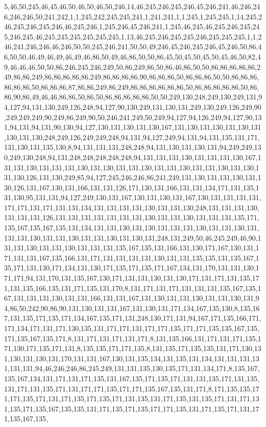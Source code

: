 5,46,50,245,46,45,46,50,46,50,46,50,246,14,46,245,246,245,246,45,246,241,46,246,246,246,246,50,241,242,1,1,245,242,245,245,241,1,241,241,1,1,245,1,245,245,1,14,245,246,245,246,245,246,46,245,246,1,245,246,45,246,241,1,245,46,245,46,245,246,245,245,246,245,46,245,245,245,245,245,245,1,13,46,245,246,245,245,246,245,245,245,1,1,246,241,246,246,46,246,50,50,245,246,241,50,50,49,246,45,246,245,246,45,246,50,86,46,50,50,46,49,46,49,46,49,46,86,50,49,46,86,50,50,86,45,50,45,50,45,50,45,46,50,82,49,46,46,46,50,50,86,246,245,246,249,50,86,249,86,50,86,46,86,50,50,86,86,86,86,86,249,86,86,249,86,86,86,86,86,249,86,86,86,86,90,86,86,86,50,86,86,86,50,50,86,86,86,86,86,86,50,86,86,86,87,86,86,249,86,249,86,86,86,86,86,86,50,86,86,86,86,86,50,86,86,90,86,49,46,46,86,86,50,86,50,86,86,86,86,86,50,50,249,130,248,249,130,249,131,94,127,94,131,130,249,126,248,94,127,90,130,249,131,130,131,249,130,249,126,249,90,249,249,249,90,249,86,249,90,50,246,241,249,50,249,94,127,94,126,249,94,127,90,131,94,131,94,131,90,130,94,127,130,131,130,131,130,167,131,130,131,130,131,130,131,130,131,130,248,249,126,249,249,248,94,131,94,127,249,94,131,94,131,135,131,171,131,130,131,135,130,8,94,131,131,131,248,248,94,131,130,131,130,131,94,249,249,130,249,130,248,94,131,248,248,248,248,248,94,131,131,131,130,131,131,131,130,167,131,131,130,131,131,131,130,131,130,131,131,130,131,131,130,131,131,130,131,130,131,130,126,131,130,249,85,94,127,245,246,246,86,241,249,131,130,131,131,130,131,130,126,131,167,130,131,166,131,131,126,171,130,131,166,131,131,134,171,131,135,131,130,95,131,131,94,127,249,130,131,167,130,131,130,131,167,130,131,131,131,131,171,171,131,171,131,131,134,131,131,131,131,130,131,131,130,248,131,131,131,130,131,131,131,126,131,131,131,131,131,131,131,130,131,131,130,131,131,131,135,171,135,167,135,167,135,131,134,131,131,130,131,130,131,131,131,130,131,131,130,131,131,131,130,131,131,130,131,131,130,131,130,131,248,131,249,50,46,245,249,46,90,131,131,130,131,131,130,131,131,131,135,167,135,131,166,131,130,171,167,130,131,171,131,131,167,135,166,131,171,131,131,131,131,130,131,131,135,135,131,135,167,135,171,131,130,171,134,131,130,171,135,171,135,171,167,134,131,170,131,131,130,171,171,94,131,170,131,135,167,130,171,131,131,130,131,130,171,131,171,131,135,171,131,135,166,135,131,171,135,131,170,8,131,171,131,171,131,131,131,135,167,135,167,131,131,131,130,131,131,166,131,131,167,131,130,131,131,130,131,131,130,131,94,86,50,242,90,86,90,131,130,131,131,167,131,130,131,171,134,167,135,130,8,135,167,131,135,171,135,171,134,167,135,171,131,248,130,171,131,94,167,171,135,166,171,171,134,171,131,171,130,135,131,171,171,131,171,171,135,171,171,135,135,167,135,171,135,167,135,171,8,131,171,131,171,131,171,8,131,135,166,131,171,131,171,135,171,130,171,135,171,131,8,135,135,171,171,135,8,131,135,171,135,135,131,171,130,131,130,131,130,131,170,131,131,167,130,131,135,134,131,135,131,134,131,131,131,131,131,131,94,46,246,246,86,245,249,131,131,135,130,135,171,131,134,171,8,135,167,135,167,134,131,171,131,171,135,131,167,135,171,135,171,131,131,135,171,131,135,131,171,131,135,171,131,171,171,135,171,171,135,167,135,131,171,8,171,135,135,171,171,135,171,131,171,135,171,135,171,131,135,131,171,135,131,135,171,131,171,131,135,171,135,167,135,135,131,171,135,171,135,171,171,135,131,171,135,171,131,171,135,167,135,
